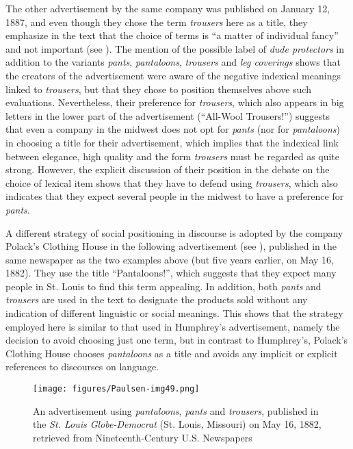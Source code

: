The other advertisement by the same company was published on January 12, 1887, and even though they chose the term \emph{trousers} here as a title, they emphasize in the text that the choice of terms is “a matter of individual fancy” and not important (see ). The mention of the possible label of \emph{dude protectors} in addition to the variants \emph{pants}, \emph{pantaloons}, \emph{trousers} and \emph{leg coverings} shows that the creators of the advertisement were aware of the negative indexical meanings linked to \emph{trousers}, but that they chose to position themselves above such evaluations. Nevertheless, their preference for \emph{trousers}, which also appears in big letters in the lower part of the advertisement (“All-Wool Trousers!”) suggests that even a company in the midwest does not opt for \emph{pants} (nor for \emph{pantaloons}) in choosing a title for their advertisement, which implies that the indexical link between elegance, high quality and the form \emph{trousers} must be regarded as quite strong. However, the explicit discussion of their position in the debate on the choice of lexical item shows that they have to defend using \emph{trousers}, which also indicates that they expect several people in the midwest to have a preference for \emph{pants}.



A different strategy of social positioning in discourse is adopted by the company Polack’s Clothing House in the following advertisement (see ), published in the same newspaper as the two examples above (but five years earlier, on May 16, 1882). They use the title “Pantaloons!”, which suggests that they expect many people in St. Louis to find this term appealing. In addition, both \emph{pants} and \emph{trousers} are used in the text to designate the products sold without any indication of different linguistic or social meanings. This shows that the strategy employed here is similar to that used in Humphrey’s advertisement, namely the decision to avoid choosing just one term, but in contrast to Humphrey’s, Polack’s Clothing House chooses \emph{pantaloons} as a title and avoids any implicit or explicit references to discourses on language.


\begin{figure}
\texttt{[image: figures/Paulsen-img49.png]}
\caption{
An advertisement using \emph{pantaloons}, \emph{pants} and \emph{trousers}, published in the \emph{St. Louis Globe-Democrat} (St. Louis, Missouri) on May 16, 1882, retrieved from Nineteenth-Century U.S. Newspapers
}
\label{fig:key:49}
\end{figure}


